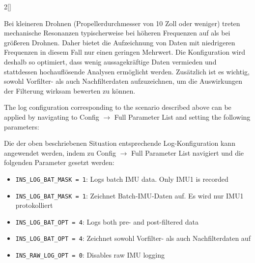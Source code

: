 \begin{paracol}{2}[]
\colger

Bei kleineren Drohnen (Propellerdurchmesser von 10 Zoll oder weniger) treten mechanische Resonanzen typischerweise bei höheren Frequenzen auf als bei größeren Drohnen. Daher bietet die Aufzeichnung von Daten mit niedrigeren Frequenzen in diesem Fall nur einen geringen Mehrwert. Die Konfiguration wird deshalb so optimiert, dass wenig aussagekräftige Daten vermieden und stattdessen hochauflösende Analysen ermöglicht werden. Zusätzlich ist es wichtig, sowohl Vorfilter- als auch Nachfilterdaten aufzuzeichnen, um die Auswirkungen der Filterung wirksam bewerten zu können.

\coleng

The log configuration corresponding to the scenario described above can be applied by navigating to Config \(\longrightarrow\) Full Parameter List and setting the following parameters:

\colger

Die der oben beschriebenen Situation entsprechende Log-Konfiguration kann angewendet werden, indem zu Config \(\longrightarrow\) Full Parameter List navigiert und die folgenden Parameter gesetzt werden:

\coleng

\begin{itemize}
\item \texttt{INS\_LOG\_BAT\_MASK = 1}: Logs batch IMU data. Only IMU1 is recorded
\end{itemize}

\colger

\begin{itemize}
\item \texttt{INS\_LOG\_BAT\_MASK = 1}: Zeichnet Batch-IMU-Daten auf. Es wird nur IMU1 protokolliert
\end{itemize}

\coleng

\begin{itemize}
\item \texttt{INS\_LOG\_BAT\_OPT = 4}: Logs both pre- and post-filtered data
\end{itemize}

\colger

\begin{itemize}
\item \texttt{INS\_LOG\_BAT\_OPT = 4}: Zeichnet sowohl Vorfilter- als auch Nachfilterdaten auf
\end{itemize}

\coleng

\begin{itemize}
\item \texttt{INS\_RAW\_LOG\_OPT = 0}: Disables raw IMU logging
\end{itemize}


\end{paracol}

